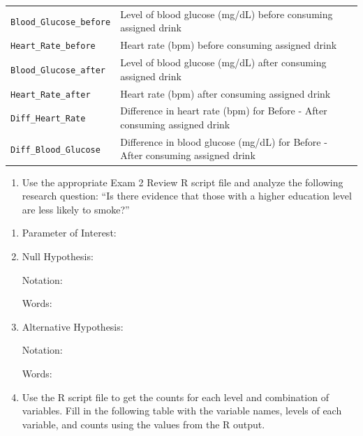 \documentclass[
]{report}
\providecommand{\tightlist}{%
  \setlength{\itemsep}{0pt}\setlength{\parskip}{0pt}}
\begin{document}
\begin{longtable}[]{@{}
  >{\raggedright\arraybackslash}p{}
  >{\raggedright\arraybackslash}p{}@{}}
\texttt{Blood\_Glucose\_before} & Level of blood glucose (mg/dL) before consuming assigned drink \\
\texttt{Heart\_Rate\_before} & Heart rate (bpm) before consuming assigned drink \\
\texttt{Blood\_Glucose\_after} & Level of blood glucose (mg/dL) after consuming assigned drink \\
\texttt{Heart\_Rate\_after} & Heart rate (bpm) after consuming assigned drink \\
\texttt{Diff\_Heart\_Rate} & Difference in heart rate (bpm) for Before - After consuming assigned drink \\
\texttt{Diff\_Blood\_Glucose} & Difference in blood glucose (mg/dL) for Before - After consuming assigned drink \\
\end{longtable}

\begin{enumerate}
\def\labelenumi{\arabic{enumi}.}
\tightlist
\item
  Use the appropriate Exam 2 Review R script file and analyze the following research question: ``Is there evidence that those with a higher education level are less likely to smoke?''
\end{enumerate}

\begin{enumerate}
\def\labelenumi{\alph{enumi}.}
\item
  Parameter of Interest:
  \vspace{0.3in}
\item
  Null Hypothesis:

  Notation:
  \vspace{0.3in}

  Words:
  \vspace{0.5in}
\item
  Alternative Hypothesis:

  Notation:
  \vspace{0.3in}

  Words:
  \vspace{0.5in}
\item
  Use the R script file to get the counts for each level and combination of variables. Fill in the following table with the variable names, levels of each variable, and counts using the values from the R output.
\end{enumerate}
\end{document}

